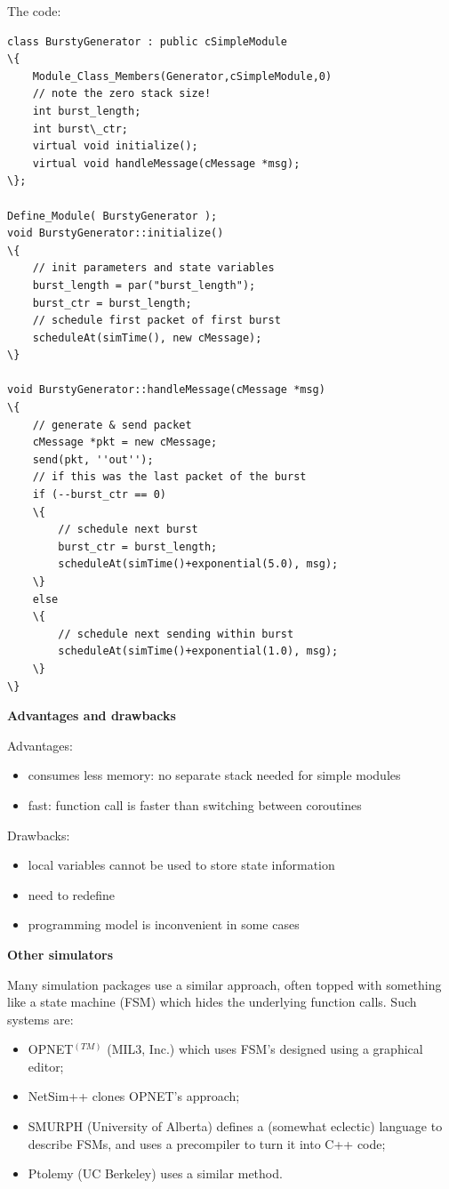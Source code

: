 The code:


\begin{Verbatim}[commandchars=\\\{\}]
class BurstyGenerator : public cSimpleModule
\{
    Module_Class_Members(Generator,cSimpleModule,0)
    // note the zero stack size!
    int burst_length;
    int burst\_ctr;
    virtual void initialize();
    virtual void handleMessage(cMessage *msg);
\};

Define_Module( BurstyGenerator );
void BurstyGenerator::initialize()
\{
    // init parameters and state variables
    burst_length = par("burst_length");
    burst_ctr = burst_length;
    // schedule first packet of first burst
    scheduleAt(simTime(), new cMessage);
\}

void BurstyGenerator::handleMessage(cMessage *msg)
\{
    // generate & send packet
    cMessage *pkt = new cMessage;
    send(pkt, ''out'');
    // if this was the last packet of the burst
    if (--burst_ctr == 0)
    \{
        // schedule next burst
        burst_ctr = burst_length;
        scheduleAt(simTime()+exponential(5.0), msg);
    \}
    else
    \{
        // schedule next sending within burst
        scheduleAt(simTime()+exponential(1.0), msg);
    \}
\}
\end{Verbatim}
  


\textbf{Advantages and drawbacks}


Advantages:
\begin{itemize}
\item{consumes less memory: no separate stack needed for
    simple modules}
\item{fast: function call is faster than switching between coroutines}
\end{itemize}


Drawbacks:
\begin{itemize}
\item{local variables cannot be used to store state information}
\item{need to redefine }
\item{programming model is inconvenient in some cases}
\end{itemize}

\textbf{Other simulators}


Many simulation packages use a similar approach, often topped with
something like a state machine
(FSM) which hides the underlying function calls. Such
systems are:
\begin{itemize}
  \item{OPNET$^{(TM)}$ (MIL3, Inc.) which uses FSM's designed using a graphical editor;}
  \item{NetSim++ clones OPNET's approach;}
  \item{SMURPH (University of Alberta) defines a (somewhat eclectic) 
      language to describe FSMs, and uses a precompiler to turn it 
      into C++ code;}
  \item{Ptolemy (UC Berkeley) uses a similar method.}
\end{itemize}

